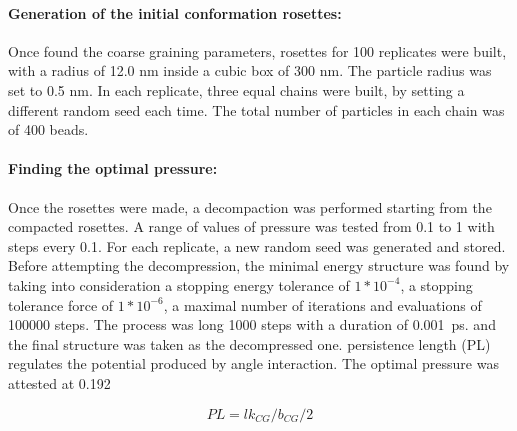 


\paragraph{Generation of the initial conformation rosettes:}

Once found the coarse graining parameters, rosettes for 100 replicates were built, with a radius of 12.0 nm inside a cubic box of 300 nm. The particle radius was set to 0.5 nm. In each replicate, three equal chains were built, by setting a different random seed each time. The total number of particles in each chain was of 400 beads.



\paragraph{Finding the optimal pressure:}

Once the rosettes were made, a decompaction was performed starting from the compacted rosettes. A range of values of pressure was tested from 0.1 to 1 with steps every 0.1. For each replicate, a new random seed was generated and stored.
Before attempting the decompression, the minimal energy structure was found by taking into consideration a stopping energy tolerance of $1*10^{-4}$, a stopping tolerance force of $1*10^{-6}$, a maximal number of iterations and evaluations of 100000 steps. %
The process was long 1000 steps with a duration of \SI{0.001}{\pico\second}. %
and the final structure was taken as the decompressed one.
persistence length (PL) regulates the potential produced by angle interaction.
The optimal pressure was attested at 0.192 %


\begin{equation} \label{eq: persistence length}
    PL = lk_{CG} / b_{CG} / 2
\end{equation}

